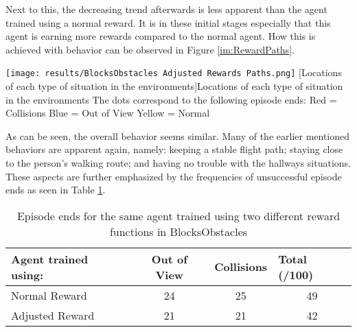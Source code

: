 Next to this, the decreasing 
trend afterwards is less apparent than the agent trained using a normal reward. It is 
in these initial stages especially that this agent is earning more rewards compared to 
the normal agent. How this is achieved with behavior can be observed in Figure \ref{im:RewardPaths}. 

\begin{SCfigure}[][h]
    \centering
    \texttt{[image: results/BlocksObstacles Adjusted Rewards Paths.png]}
    [Locations of each type of situation in the environments]{Locations of each type of situation in the environments\newline\newline\newline\newline
    The dots correspond to the following episode ends: \newline
    Red = Collisions\newline
    Blue = Out of View \newline
    Yellow = Normal}
    \label{im:RewardPaths}
\end{SCfigure}

As can be seen, the overall behavior seems similar. Many of the earlier mentioned behaviors
are apparent again, namely: keeping a stable flight path; staying close to the person's 
walking route; and having no trouble with the hallways situations. These aspects are further 
emphasized by the frequencies of unsuccessful episode ends as seen in Table \ref{tab:RewardEnds}.

\begin{table}[h]
    \centering
    \caption{Episode ends for the same agent trained using two different reward functions in BlocksObstacles}
    \label{tab:RewardEnds}
    \begin{tabular}{l|c|c|c}
    \textbf{Agent trained using:} & \textbf{Out of View} & \textbf{Collisions} & \multicolumn{1}{l}{\textbf{Total (/100)}} \\ \hline
    Normal Reward                 & 24                   & 25                  & 49                                        \\
    Adjusted Reward               & 21                   & 21                  & 42                                       
    \end{tabular}
\end{table}

